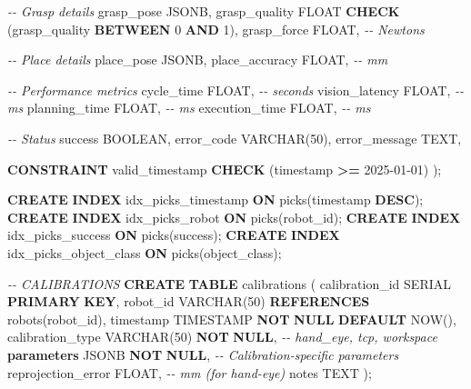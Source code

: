 \documentclass[
]{article}
\newenvironment{Shaded}{\begin{snugshade}}{\end{snugshade}}
\newcommand{\CommentTok}[1]{\textcolor[rgb]{0.56,0.35,0.01}{\textit{#1}}}
\newcommand{\DataTypeTok}[1]{\textcolor[rgb]{0.13,0.29,0.53}{#1}}
\newcommand{\DecValTok}[1]{\textcolor[rgb]{0.00,0.00,0.81}{#1}}
\newcommand{\KeywordTok}[1]{\textcolor[rgb]{0.13,0.29,0.53}{\textbf{#1}}}
\newcommand{\NormalTok}[1]{#1}
\newcommand{\OperatorTok}[1]{\textcolor[rgb]{0.81,0.36,0.00}{\textbf{#1}}}
\newcommand{\StringTok}[1]{\textcolor[rgb]{0.31,0.60,0.02}{#1}}
\begin{document}
\begin{Shaded}
\begin{Highlighting}[]
    \CommentTok{{-}{-} Grasp details}
\NormalTok{    grasp\_pose JSONB,}
\NormalTok{    grasp\_quality }\DataTypeTok{FLOAT} \KeywordTok{CHECK}\NormalTok{ (grasp\_quality }\KeywordTok{BETWEEN} \DecValTok{0} \KeywordTok{AND} \DecValTok{1}\NormalTok{),}
\NormalTok{    grasp\_force }\DataTypeTok{FLOAT}\NormalTok{,  }\CommentTok{{-}{-} Newtons}

    \CommentTok{{-}{-} Place details}
\NormalTok{    place\_pose JSONB,}
\NormalTok{    place\_accuracy }\DataTypeTok{FLOAT}\NormalTok{,  }\CommentTok{{-}{-} mm}

    \CommentTok{{-}{-} Performance metrics}
\NormalTok{    cycle\_time }\DataTypeTok{FLOAT}\NormalTok{,  }\CommentTok{{-}{-} seconds}
\NormalTok{    vision\_latency }\DataTypeTok{FLOAT}\NormalTok{,  }\CommentTok{{-}{-} ms}
\NormalTok{    planning\_time }\DataTypeTok{FLOAT}\NormalTok{,  }\CommentTok{{-}{-} ms}
\NormalTok{    execution\_time }\DataTypeTok{FLOAT}\NormalTok{,  }\CommentTok{{-}{-} ms}

    \CommentTok{{-}{-} Status}
\NormalTok{    success }\DataTypeTok{BOOLEAN}\NormalTok{,}
\NormalTok{    error\_code }\DataTypeTok{VARCHAR}\NormalTok{(}\DecValTok{50}\NormalTok{),}
\NormalTok{    error\_message TEXT,}

    \KeywordTok{CONSTRAINT}\NormalTok{ valid\_timestamp }\KeywordTok{CHECK}\NormalTok{ (}\DataTypeTok{timestamp} \OperatorTok{\textgreater{}=} \StringTok{\textquotesingle{}2025{-}01{-}01\textquotesingle{}}\NormalTok{)}
\NormalTok{);}

\KeywordTok{CREATE} \KeywordTok{INDEX}\NormalTok{ idx\_picks\_timestamp }\KeywordTok{ON}\NormalTok{ picks(}\DataTypeTok{timestamp} \KeywordTok{DESC}\NormalTok{);}
\KeywordTok{CREATE} \KeywordTok{INDEX}\NormalTok{ idx\_picks\_robot }\KeywordTok{ON}\NormalTok{ picks(robot\_id);}
\KeywordTok{CREATE} \KeywordTok{INDEX}\NormalTok{ idx\_picks\_success }\KeywordTok{ON}\NormalTok{ picks(success);}
\KeywordTok{CREATE} \KeywordTok{INDEX}\NormalTok{ idx\_picks\_object\_class }\KeywordTok{ON}\NormalTok{ picks(object\_class);}

\CommentTok{{-}{-} CALIBRATIONS}
\KeywordTok{CREATE} \KeywordTok{TABLE}\NormalTok{ calibrations (}
\NormalTok{    calibration\_id SERIAL }\KeywordTok{PRIMARY} \KeywordTok{KEY}\NormalTok{,}
\NormalTok{    robot\_id }\DataTypeTok{VARCHAR}\NormalTok{(}\DecValTok{50}\NormalTok{) }\KeywordTok{REFERENCES}\NormalTok{ robots(robot\_id),}
    \DataTypeTok{timestamp} \DataTypeTok{TIMESTAMP} \KeywordTok{NOT} \KeywordTok{NULL} \KeywordTok{DEFAULT}\NormalTok{ NOW(),}
\NormalTok{    calibration\_type }\DataTypeTok{VARCHAR}\NormalTok{(}\DecValTok{50}\NormalTok{) }\KeywordTok{NOT} \KeywordTok{NULL}\NormalTok{,  }\CommentTok{{-}{-} \textquotesingle{}hand\_eye\textquotesingle{}, \textquotesingle{}tcp\textquotesingle{}, \textquotesingle{}workspace\textquotesingle{}}
    \KeywordTok{parameters}\NormalTok{ JSONB }\KeywordTok{NOT} \KeywordTok{NULL}\NormalTok{,  }\CommentTok{{-}{-} Calibration{-}specific parameters}
\NormalTok{    reprojection\_error }\DataTypeTok{FLOAT}\NormalTok{,  }\CommentTok{{-}{-} mm (for hand{-}eye)}
\NormalTok{    notes TEXT}
\NormalTok{);}


\end{Highlighting}
\end{Shaded}
\end{document}
